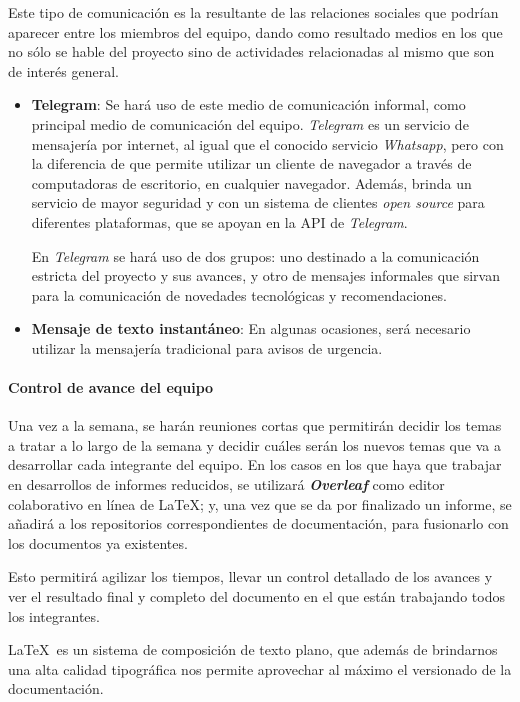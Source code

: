 Este tipo de comunicación es la resultante de las relaciones sociales que podrían aparecer entre los miembros del equipo, dando como resultado medios en los que no sólo se hable del proyecto sino de actividades relacionadas al mismo que son de interés general.
	\begin{itemize}
	\item{\textbf{Telegram}:}
	Se hará uso de este medio de comunicación informal, como principal medio de comunicación del equipo.
    \textit{Telegram} es un servicio de mensajería por internet, al igual que el conocido servicio \textit{Whatsapp}, pero con la diferencia de que permite utilizar un cliente de navegador a través de computadoras de escritorio, en cualquier navegador.
    Además, brinda un servicio de mayor seguridad y con un sistema de clientes \textit{open source} para diferentes plataformas, que se apoyan en la API de \textit{Telegram}.
    
    En \textit{Telegram} se hará uso de dos grupos: uno destinado a la comunicación estricta del proyecto y sus avances, y otro de mensajes informales que sirvan para la comunicación de novedades tecnológicas y recomendaciones.
    
	\item{\textbf{Mensaje de texto instantáneo}:}
    En algunas ocasiones, será necesario utilizar la mensajería tradicional para avisos de urgencia.
	\end{itemize}


\paragraph{Control de avance del equipo}

Una vez a la semana, se harán reuniones cortas que permitirán decidir los temas a tratar a lo largo de la semana y decidir cuáles serán los nuevos temas que va a desarrollar cada integrante del equipo.
En los casos en los que haya que trabajar en desarrollos de informes reducidos, se utilizará \textbf{\textit{Overleaf}} como editor colaborativo en línea de \LaTeX; y, una vez que se da por finalizado un informe, se añadirá a los repositorios correspondientes de documentación, para fusionarlo con los documentos ya existentes.

Esto permitirá agilizar los tiempos, llevar un control detallado de los avances y ver el resultado final y completo del documento en el que están trabajando todos los integrantes.

\LaTeX\ es un sistema de composición de texto plano, que además de brindarnos una alta calidad tipográfica nos permite aprovechar al máximo el versionado de la documentación. 
    
